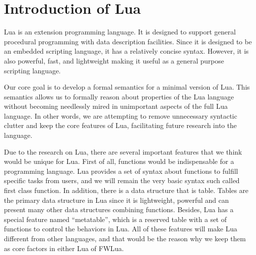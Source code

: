 \chapter{Introduction of Lua}
Lua is an extension programming language. It is designed to support general procedural programming with data description facilities\cite{EEL}. Since it is designed to be an embedded scripting language, it has a relatively concise syntax. However, it is also powerful, fast, and lightweight making it useful as a general purpose scripting language.



Our core goal is to develop a formal semantics for a minimal version of Lua. This semantics allows us to formally reason about properties of the Lua language without becoming needlessly mired in unimportant aspects of the full Lua language. In other words, we are attempting to remove unnecessary syntactic clutter and keep the core features of Lua, facilitating future research into the language.


Due to the research on Lua\cite{LRM}, there are several important features that we think would be unique for Lua. First of all, functions would be indispensable for a programming language. Lua provides a set of syntax about functions to fulfill specific tasks from users, and we will remain the very basic syntax such called first class function. In addition, there is a data structure that is table. Tables are the primary data structure in Lua since it is lightweight, powerful and can present many other data structures combining functions. Besides, Lua has a special feature named ``metatable'', which is a reserved table with a set of functions to control the behaviors in Lua. All of these features will make Lua different from other languages, and that would be the reason why we keep them as core factors in either Lua of FWLua.

